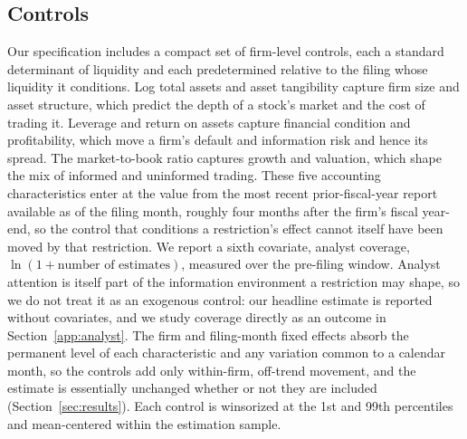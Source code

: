 \documentclass[12pt]{article}
\begin{document}
\subsection{Controls}\label{sec:data_ctrl}
Our specification includes a compact set of firm-level controls, each a standard determinant of liquidity and each predetermined relative to the filing whose liquidity it conditions. Log total assets and asset tangibility capture firm size and asset structure, which predict the depth of a stock's market and the cost of trading it. Leverage and return on assets capture financial condition and profitability, which move a firm's default and information risk and hence its spread. The market-to-book ratio captures growth and valuation, which shape the mix of informed and uninformed trading. These five accounting characteristics enter at the value from the most recent prior-fiscal-year report available as of the filing month, roughly four months after the firm's fiscal year-end, so the control that conditions a restriction's effect cannot itself have been moved by that restriction. We report a sixth covariate, analyst coverage, $\ln(1+\text{number of estimates})$, measured over the pre-filing window. Analyst attention is itself part of the information environment a restriction may shape, so we do not treat it as an exogenous control: our headline estimate is reported without covariates, and we study coverage directly as an outcome in Section~\ref{app:analyst}. The firm and filing-month fixed effects absorb the permanent level of each characteristic and any variation common to a calendar month, so the controls add only within-firm, off-trend movement, and the estimate is essentially unchanged whether or not they are included (Section~\ref{sec:results}). Each control is winsorized at the 1st and 99th percentiles and mean-centered within the estimation sample.
\end{document}

